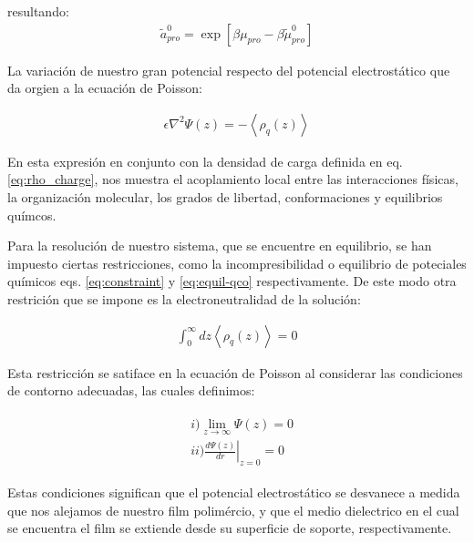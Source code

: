  resultando:
\begin{align}
	\tilde{a}^0_{pro} = \exp[\beta\mu_{pro} - \beta\tilde{\mu}^0_{pro}]
	\label{eq:film:actividad-pro}
\end{align}

La variaci\'on de nuestro gran potencial respecto del potencial electrost\'atico que da orgien a la ecuaci\'on de Poisson:

\begin{align}
	\epsilon \nabla^2 \Psi(z) = - \left< \rho_q (z)\right>
\end{align}

En esta expresi\'on en conjunto con  la densidad de carga definida en eq. \ref{eq:rho_charge}, nos muestra el acoplamiento local entre las interacciones f\'isicas, la organizaci\'on molecular, los grados de libertad, conformaciones y equilibrios qu\'imcos. 

Para la resoluci\'on de nuestro sistema, que se encuentre en equilibrio, se han impuesto ciertas restricciones, como la incompresibilidad o equilibrio de poteciales qu\'imicos eqs. \ref{eq:constraint} y \ref{eq:equil-qco} respectivamente. De este modo otra restrici\'on que se impone es la electroneutralidad de la soluci\'on: 

\begin{align}
	\int_0^\infty dz \left< \rho_q (z)\right> = 0
\end{align}

Esta restricci\'on se satiface en la ecuaci\'on de Poisson al considerar las condiciones de contorno adecuadas, las cuales definimos:

\begin{align}
	\begin{aligned}
		&i)  \lim_{z\to\infty}\Psi(z) = 0 \\
		&ii) \left.\frac{d\Psi(z)}{dr}\right|_{z=0} = 0
		\label{eq:si:contorno}
	\end{aligned}
\end{align}

Estas condiciones significan que el potencial electrost\'atico se desvanece a medida que nos alejamos de nuestro film polim\'ercio,  y que el medio dielectrico en el cual se encuentra el film  se extiende desde su superficie de soporte, respectivamente. 

